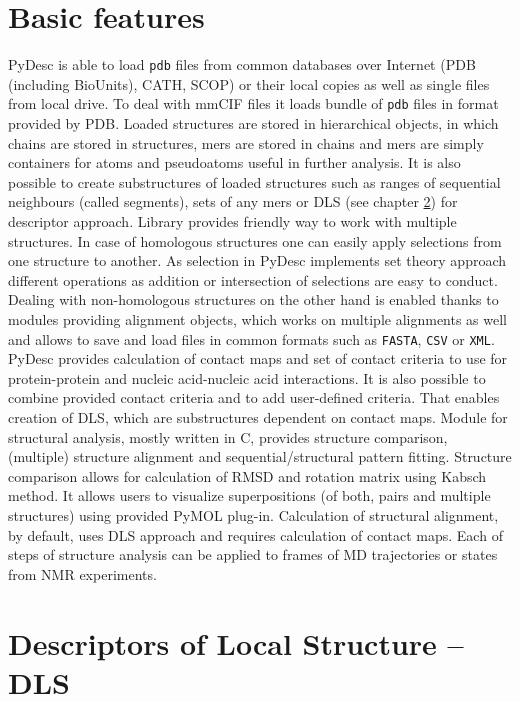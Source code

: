\documentclass{article}
\begin{document}
\section{Basic features}
    PyDesc is able to load \texttt{pdb} files from common databases over Internet (PDB (including BioUnits), CATH, SCOP) or their local copies as well as single files from local drive. To deal with mmCIF files it loads bundle of \texttt{pdb} files in format provided by PDB.
    Loaded structures are stored in hierarchical objects, in which chains are stored in structures, mers are stored in chains and mers are simply containers for atoms and pseudoatoms useful in further analysis. It is also possible to create substructures of loaded structures such as ranges of sequential neighbours (called segments), sets of any mers or DLS (see chapter \ref{DLSsec}) for descriptor approach.
    Library provides friendly way to work with multiple structures. In case of homologous structures one can easily apply selections from one structure to another. As selection in PyDesc implements set theory approach different operations as addition or intersection of selections are easy to conduct. Dealing with non-homologous structures on the other hand is enabled thanks to modules providing alignment objects, which works on multiple alignments as well and allows to save and load files in common formats such as \texttt{FASTA}, \texttt{CSV} or \texttt{XML}.
    PyDesc provides calculation of contact maps and set of contact criteria to use for protein-protein and nucleic acid-nucleic acid interactions. It is also possible to combine provided contact criteria and to add user-defined criteria. That enables creation of DLS, which are substructures dependent on contact maps.
    Module for structural analysis, mostly written in C, provides structure comparison, (multiple) structure alignment and sequential/structural pattern fitting. Structure comparison allows for calculation of RMSD and rotation matrix using Kabsch method. It allows users to visualize superpositions (of both, pairs and multiple structures) using provided PyMOL plug-in. Calculation of structural alignment, by default, uses DLS approach and requires calculation of contact maps.
    Each of steps of structure analysis can be applied to frames of MD trajectories or states from NMR experiments.

\section{Descriptors of Local Structure -- DLS} \label{DLSsec}
\end{document}
